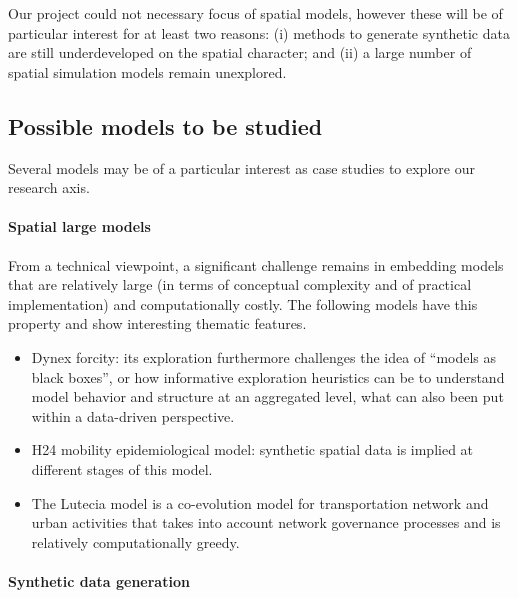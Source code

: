 
Our project could not necessary focus of spatial models, however these will be of particular interest for at least two reasons: (i) methods to generate synthetic data are still underdeveloped on the spatial character; and (ii) a large number of spatial simulation models remain unexplored.



\subsection{Possible models to be studied}

Several models may be of a particular interest as case studies to explore our research axis. 

\paragraph{Spatial large models}

From a technical viewpoint, a significant challenge remains in embedding models that are relatively large (in terms of conceptual complexity and of practical implementation) and computationally costly. The following models have this property and show interesting thematic features.

\begin{itemize}
\item Dynex forcity: its exploration furthermore challenges the idea of ``models as black boxes'', or how informative exploration heuristics can be to understand model behavior and structure at an aggregated level, what can also been put within a data-driven perspective.
\item H24 mobility epidemiological model: synthetic spatial data is implied at different stages of this model.
\item The Lutecia model \cite{lenechet:halshs-01272236} is a co-evolution model for transportation network and urban activities that takes into account network governance processes and is relatively computationally greedy.
\end{itemize}


\paragraph{Synthetic data generation}

